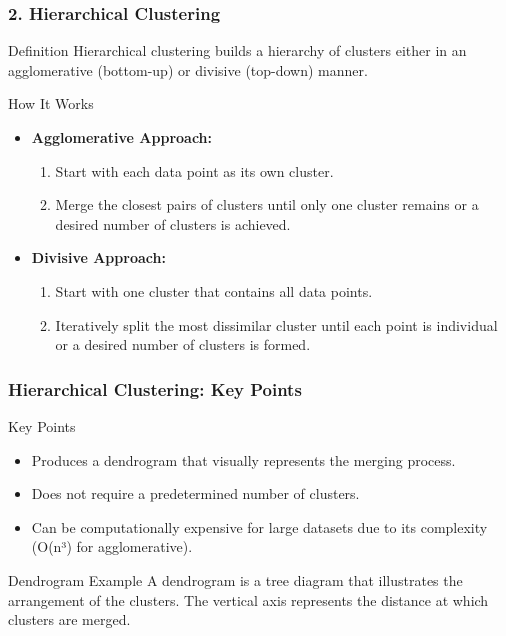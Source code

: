 \documentclass[aspectratio=169]{beamer}
\begin{document}
\begin{frame}[fragile]
    \frametitle{2. Hierarchical Clustering}
    \begin{block}{Definition}
        Hierarchical clustering builds a hierarchy of clusters either in an agglomerative (bottom-up) or divisive (top-down) manner.
    \end{block}
    
    \begin{block}{How It Works}
        \begin{itemize}
            \item \textbf{Agglomerative Approach:}
              \begin{enumerate}
                  \item Start with each data point as its own cluster.
                  \item Merge the closest pairs of clusters until only one cluster remains or a desired number of clusters is achieved.
              \end{enumerate}
            \item \textbf{Divisive Approach:}
              \begin{enumerate}
                  \item Start with one cluster that contains all data points.
                  \item Iteratively split the most dissimilar cluster until each point is individual or a desired number of clusters is formed.
              \end{enumerate}
        \end{itemize}
    \end{block}
\end{frame}

\begin{frame}[fragile]
    \frametitle{Hierarchical Clustering: Key Points}
    \begin{block}{Key Points}
        \begin{itemize}
            \item Produces a dendrogram that visually represents the merging process.
            \item Does not require a predetermined number of clusters.
            \item Can be computationally expensive for large datasets due to its complexity (O(n³) for agglomerative).
        \end{itemize}
    \end{block}

    \begin{block}{Dendrogram Example}
        A dendrogram is a tree diagram that illustrates the arrangement of the clusters. The vertical axis represents the distance at which clusters are merged.
    \end{block}
\end{frame}
\end{document}
